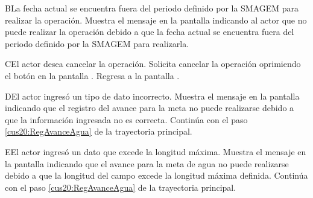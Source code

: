  \begin{UCtrayectoriaA}{B}{La fecha actual se encuentra fuera del periodo definido por la SMAGEM para realizar la operación.}
    \UCpaso[\UCsist] Muestra el mensaje  en la pantalla  indicando al actor que no puede realizar la operación debido a que la fecha actual se encuentra fuera del periodo definido por la SMAGEM para realizarla. 
 \end{UCtrayectoriaA}
 
     \begin{UCtrayectoriaA}{C}{El actor desea cancelar la operación.}
      \UCpaso[\UCactor] Solicita cancelar la operación oprimiendo el botón  en la pantalla .
      \UCpaso[] Regresa a la pantalla . 
    \end{UCtrayectoriaA}
    
    \begin{UCtrayectoriaA}{D}{El actor ingresó un tipo de dato incorrecto.}    
	\UCpaso[\UCsist] Muestra el mensaje  en la pantalla  indicando que el registro del avance para la meta no puede realizarse debido a que la información ingresada no es correcta.
	\UCpaso[] Continúa con el paso \ref{cus20:RegAvanceAgua} de la trayectoria principal.     
    \end{UCtrayectoriaA}
    
    \begin{UCtrayectoriaA}{E}{El actor ingresó un dato que excede la longitud máxima.}    
	\UCpaso[\UCsist] Muestra el mensaje  en la pantalla  indicando que el avance para la meta de agua no puede realizarse debido a que la longitud del campo excede la longitud máxima definida.
	\UCpaso[] Continúa con el paso \ref{cus20:RegAvanceAgua} de la trayectoria principal.     
    \end{UCtrayectoriaA}

